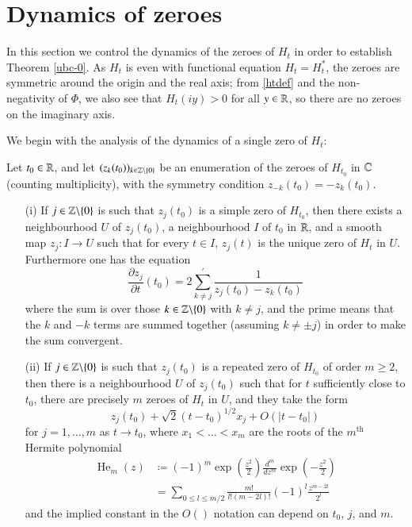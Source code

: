 \section{Dynamics of zeroes}\label{dynamics-sec}

In this section we control the dynamics of the zeroes of $H_t$ in order to establish Theorem \ref{ubc-0}.  As $H_t$ is even with functional equation $H_t = H_t^*$, the zeroes are symmetric around the origin and the real axis; from \eqref{htdef} and the non-negativity of $\Phi$, we also see that $H_t(iy) > 0$ for all $y \in \mathbb{R}$, so there are no zeroes on the imaginary axis.

We begin with the analysis of the dynamics of a single zero of $H_t$:

\begin{proposition}\label{dynam}  Let $t_0 \in \mathbb{R}$, and let $(z_k(t_0))_{k \in \mathbb{Z} \backslash \{0\}}$ be an enumeration of the zeroes of $H_{t_0}$ in $\mathbb{C}$ (counting multiplicity), with the symmetry condition $z_{-k}(t_0) = -z_k(t_0)$.
\begin{itemize}
\item[(i)]  If $j \in \mathbb{Z} \backslash \{0\}$ is such that $z_j(t_0)$ is a simple zero of $H_{t_0}$, then there exists a neighbourhood $U$ of $z_j(t_0)$, a neighbourhood $I$ of $t_0$ in $\mathbb{R}$, and a smooth map $z_j: I \to U$ such that for every $t \in I$, $z_j(t)$ is the unique zero of $H_t$ in $U$.  Furthermore one has the equation
\begin{equation}\label{zjk}
 \frac{\partial z_j}{\partial t}(t_0) = 2 \sum^{\prime}_{k \neq j} \frac{1}{z_j(t_0) - z_k(t_0)} 
\end{equation}
where the sum is over those $k \in \mathbb{Z} \backslash \{0\}$ with $k \neq j$, and the prime means that the $k$ and $-k$ terms are summed together (assuming $k \neq \pm j$) in order to make the sum convergent.
\item[(ii)]  If $j \in \mathbb{Z} \backslash \{0\}$ is such that $z_j(t_0)$ is a repeated zero of $H_{t_0}$ of order $m \geq 2$, then there is a neighbourhood $U$ of $z_j(t_0)$ such that for $t$ sufficiently close to $t_0$, there are precisely $m$ zeroes of $H_t$ in $U$, and they take the form
$$ z_j(t_0) + \sqrt{2} (t-t_0)^{1/2} x_j + O( |t-t_0|)$$
for $j=1,\dots,m$ as $t \to t_0$, where $x_1 < \dots < x_m$ are the roots of the $m^{\operatorname{th}}$ Hermite polynomial
\begin{align}
\operatorname{He}_m(z) &\coloneqq (-1)^m \exp\left(\frac{z^2}{2}\right) \frac{d^m}{dz^m} \exp\left(-\frac{z^2}{2}\right)\label{heform}\\
&= \sum_{0 \leq l \leq m/2} \frac{m!}{l! (m-2l)!} (-1)^l \frac{z^{m-2l}}{2^l}\label{heform2}
\end{align}
and the implied constant in the $O()$ notation can depend on $t_0$, $j$, and $m$.
\end{itemize}
\end{proposition}

